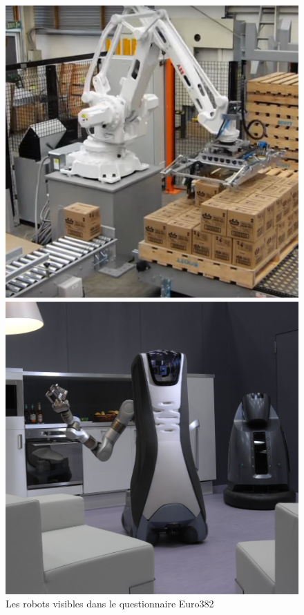                 \begin{figure}[!h]
                    \begin{minipage}{0.45\linewidth}
                    \includegraphics[width=\linewidth]{Figures/Euro-QI2_1}
                    \end{minipage}
                    \hfill
                    \begin{minipage}{0.45\linewidth}
                    \includegraphics[width=\linewidth]{Figures/Euro-QI2_2}
                    \end{minipage}
                    \caption{Les robots visibles dans le questionnaire Euro382}
                \end{figure}
